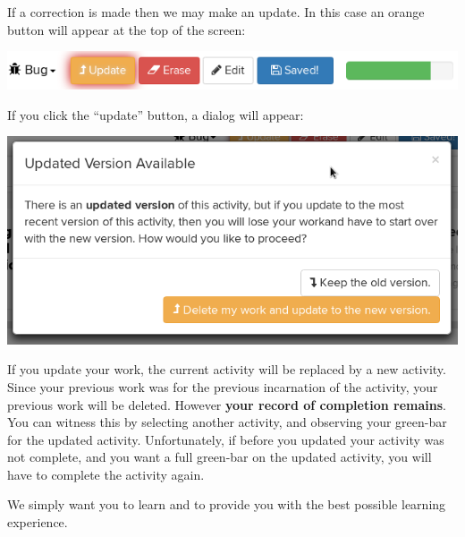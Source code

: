\documentclass{ximera}
\begin{document}
If a correction is made then we may make an update. In this case an orange button will appear at the top of the screen:
\begin{image}
  \includegraphics{update.png}
\end{image}
If you click the ``update'' button, a dialog will appear:
\begin{image}
  \includegraphics{updateDialog.png}
\end{image}
If you update your work, the current activity will be replaced by a
new activity. Since your previous work was for the previous
incarnation of the activity, your previous work will be
deleted. However \textbf{your record of completion remains}. You can
witness this by selecting another activity, and observing your
green-bar for the updated activity.  Unfortunately, if before you
updated your activity was not complete, and you want a full green-bar
on the updated activity, you will have to complete the activity again.



We simply want you to learn and to provide you with the best possible
learning experience.
\end{document}
